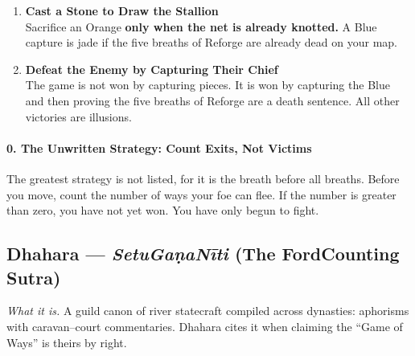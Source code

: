 \documentclass[11pt]{article}
\begin{document}
\begin{enumerate}[leftmargin=*,label=\textbf{\arabic*.}]
\item \textbf{Cast a Stone to Draw the Stallion}\\
Sacrifice an Orange \textbf{only when the net is already knotted.} A Blue capture is jade if the five breaths of Reforge are already dead on your map.

\item \textbf{Defeat the Enemy by Capturing Their Chief}\\
The game is not won by capturing pieces. It is won by capturing the Blue and then proving the five breaths of Reforge are a death sentence. All other victories are illusions.
\end{enumerate}

\paragraph*{0. The Unwritten Strategy: Count Exits, Not Victims}
The greatest strategy is not listed, for it is the breath before all breaths. Before you move, count the number of ways your foe can flee. If the number is greater than zero, you have not yet won. You have only begun to fight.

\clearpage

\subsection{Dhahara — \textit{Setu\textendash Gaṇa\textendash Nīti} (The Ford\textendash Counting Sutra)}
\textit{What it is.} A guild canon of river statecraft compiled across dynasties: aphorisms with caravan–court commentaries. Dhahara cites it when claiming the “Game of Ways” is theirs by right.
\end{document}
